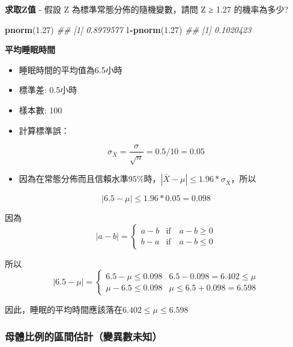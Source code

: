 \documentclass[hyperref,]{ctexart}
\newenvironment{Shaded}{\begin{snugshade}}{\end{snugshade}}
\newcommand{\CommentTok}[1]{\textcolor[rgb]{0.56,0.35,0.01}{\textit{#1}}}
\newcommand{\DecValTok}[1]{\textcolor[rgb]{0.00,0.00,0.81}{#1}}
\newcommand{\FloatTok}[1]{\textcolor[rgb]{0.00,0.00,0.81}{#1}}
\newcommand{\KeywordTok}[1]{\textcolor[rgb]{0.13,0.29,0.53}{\textbf{#1}}}
\newcommand{\NormalTok}[1]{#1}
\newcommand{\OperatorTok}[1]{\textcolor[rgb]{0.81,0.36,0.00}{\textbf{#1}}}
\providecommand{\tightlist}{%
  \setlength{\itemsep}{0pt}\setlength{\parskip}{0pt}}
\begin{document}
\textbf{求取Z值} - 假設 Z 為標準常態分佈的隨機變數，請問 Z ≥ 1.27
的機率為多少?

\begin{Shaded}
\begin{Highlighting}[]
\KeywordTok{pnorm}\NormalTok{(}\FloatTok{1.27}\NormalTok{)}
\CommentTok{## [1] 0.8979577}
\DecValTok{1}\OperatorTok{-}\KeywordTok{pnorm}\NormalTok{(}\FloatTok{1.27}\NormalTok{)}
\CommentTok{## [1] 0.1020423}
\end{Highlighting}
\end{Shaded}

\textbf{平均睡眠時間}

\begin{itemize}
\item
  睡眠時間的平均值為6.5小時
\item
  標準差: 0.5小時
\item
  樣本數: 100
\item
  計算標準誤：
\end{itemize}

\[\sigma_{\bar{X}}=\frac{\sigma}{\sqrt{n}}=0.5/10=0.05\]

\begin{itemize}
\tightlist
\item
  因為在常態分佈而且信賴水準\(95\%\)時，\(|\bar{X}-\mu|\leq 1.96*\sigma_{\bar{X}}\)，所以
\end{itemize}

\[|6.5-\mu|\leq 1.96*0.05=0.098\]

因為 \begin{equation*}
 |a-b|=
 \begin{cases}
 a-b & \text{if}\quad a-b\geq 0\\
 b-a & \text{if}\quad a-b\leq 0
 \end{cases}
\end{equation*}

所以 \begin{equation*}
 |6.5-\mu|=
 \begin{cases}
 6.5-\mu\leq 0.098 & 6.5-0.098=6.402\leq \mu \\
 \mu-6.5\leq 0.098 & \mu \leq 6.5+0.098=6.598
 \end{cases}
\end{equation*}

因此，睡眠的平均時間應該落在\(6.402\leq \mu \leq 6.598\)

\hypertarget{ux6bcdux9ad4ux6bd4ux4f8bux7684ux5340ux9593ux4f30ux8a08ux8b8aux7570ux6578ux672aux77e5}{%
\subsubsection{母體比例的區間估計（變異數未知）}\label{ux6bcdux9ad4ux6bd4ux4f8bux7684ux5340ux9593ux4f30ux8a08ux8b8aux7570ux6578ux672aux77e5}}
\end{document}
